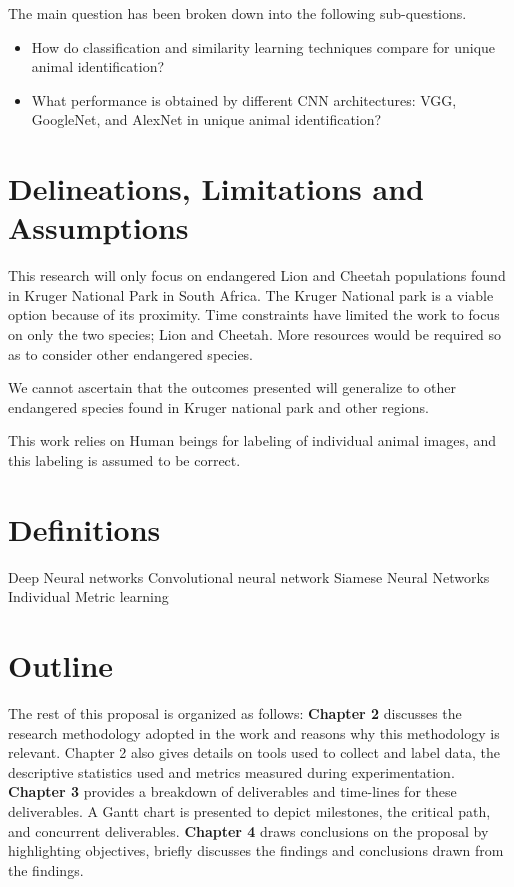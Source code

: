 The main question has been broken down into the following sub-questions.
\begin{itemize}
    \item How do classification and similarity learning techniques compare for unique animal identification?

    \item What performance is obtained by different CNN architectures: VGG, GoogleNet, and AlexNet in unique animal identification?
\end{itemize}

\section{Delineations, Limitations and Assumptions}

This research will only focus on endangered Lion and Cheetah populations found in Kruger National Park in South Africa. The Kruger National park is a viable option because of its proximity. Time constraints have limited the work to focus on only the two species; Lion and Cheetah. More resources would be required so as to consider other endangered species.

We cannot ascertain that the outcomes presented will generalize to other endangered species found in Kruger national park and other regions.

This work relies on Human beings for labeling of individual animal images, and this labeling is assumed to be correct.

\section{Definitions}
Deep Neural networks \newline
Convolutional neural network
Siamese Neural Networks \newline
Individual \newline
Metric learning \newline

\section{Outline}
The rest of this proposal is organized as follows: \textbf{Chapter 2} discusses the research methodology adopted in the work and reasons why this methodology is relevant. Chapter 2 also gives details on tools used to collect and label data, the descriptive statistics used and metrics measured during experimentation. \textbf{Chapter 3} provides a breakdown of deliverables and time-lines for these deliverables. A Gantt chart is presented to depict milestones, the critical path, and concurrent deliverables. \textbf{Chapter 4} draws conclusions on the proposal by highlighting objectives, briefly discusses the findings and conclusions drawn from the findings.